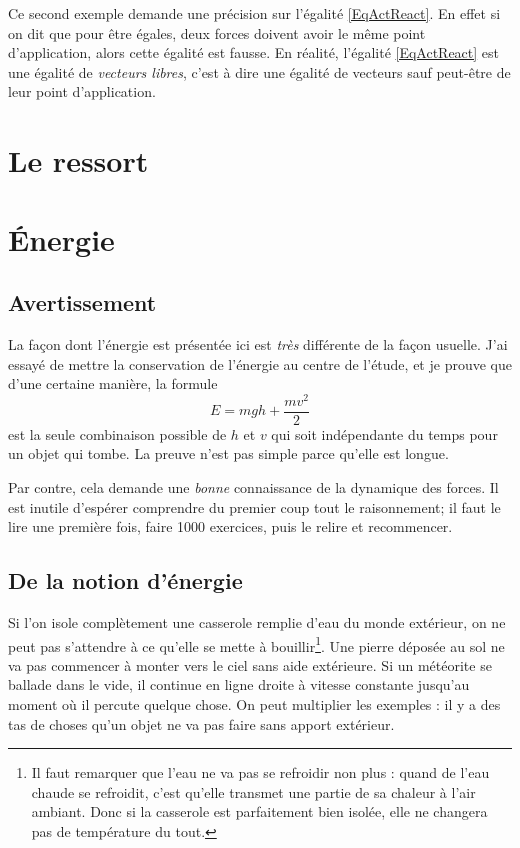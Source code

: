 \documentclass[a4paper,12pt]{book}
\theoremstyle{mes_exemples}	\newtheorem{exemple}[numtho]{Exemple}
\theoremstyle{mes_tho}
\begin{document}
Ce second exemple demande une précision sur l'égalité \eqref{EqActReact}. En effet si on dit que pour être égales, deux forces doivent avoir le même point d'application, alors cette égalité est fausse. En réalité, l'égalité \eqref{EqActReact} est une égalité de \emph{vecteurs libres}, c'est à dire une égalité de vecteurs \og sauf peut-être de leur point d'application\fg.

\section{Le ressort}





\section{Énergie} 

\subsection{Avertissement}

La façon dont l'énergie est présentée ici est \emph{très} différente de la façon usuelle. J'ai essayé de mettre la conservation de l'énergie au centre de l'étude, et je prouve que d'une certaine manière, la formule
\[ 
  E=mgh+\frac{ mv^2 }{ 2 }
\]
est la seule combinaison possible de $h$ et $v$ qui soit indépendante du temps pour un objet qui tombe. La preuve n'est pas simple parce qu'elle est longue. 

Par contre, cela demande une \emph{bonne} connaissance de la dynamique des forces. Il est inutile d'espérer comprendre du premier coup tout le raisonnement; il faut le lire une première fois, faire 1000 exercices, puis le relire et recommencer.

\subsection{De la notion d'énergie}

Si l'on isole complètement une casserole remplie d'eau du monde extérieur, on ne peut pas s'attendre à ce qu'elle se mette à bouillir\footnote{Il faut remarquer que l'eau ne va pas se refroidir non plus : quand de l'eau chaude se refroidit, c'est qu'elle transmet une partie de sa chaleur à l'air ambiant. Donc si la casserole est parfaitement bien isolée, elle ne changera pas de température du tout.}. Une pierre déposée au sol ne va pas commencer à monter vers le ciel sans aide extérieure. Si un météorite se ballade dans le vide, il continue en ligne droite à vitesse constante jusqu'au moment où il percute quelque chose. On peut multiplier les exemples : il y a des tas de choses qu'un objet ne va pas faire sans apport extérieur.
\end{document}
